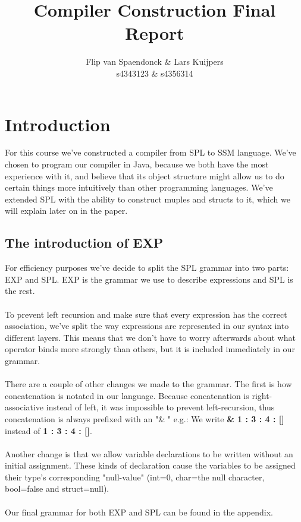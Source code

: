 \documentclass[10pt,a4paper]{article}
\author{Flip van Spaendonck \& Lars Kuijpers \\ s4343123 \& s4356314}
\title{Compiler Construction Final Report}
\begin{document}
\maketitle
\tableofcontents

\section{Introduction}
For this course we've constructed a compiler from SPL to SSM language. We've chosen to program our compiler in Java, because we both have the most experience with it, and believe that its object structure might allow us to do certain things more intuitively than other programming languages. We've extended SPL with the ability to construct muples and structs to it, which we will explain later on in the paper.

\subsection{The introduction of EXP}
For efficiency purposes we've decide to split the SPL grammar into two parts: EXP and SPL. EXP is the grammar we use to describe expressions and SPL is the rest. \\
\\
To prevent left recursion and make sure that every expression has the correct association, we've split the way expressions are represented in our syntax into different layers. This means that we don't have to worry afterwards about what operator binds more strongly than others, but it is included immediately in our grammar.\\
\\
There are a couple of other changes we made to the grammar. The first is how concatenation is notated in our language. Because concatenation is right-associative instead of left, it was impossible to prevent left-recursion, thus concatenation is always prefixed with an "\& " e.g.: We write \textbf{\& 1 : 3 : 4 : []} instead of \textbf{1 : 3 : 4 : []}.\\
\\
Another change is that we allow variable declarations to be written without an initial assignment. These kinds of declaration cause the variables to be assigned their type's corresponding "null-value" (int=0, char=the null character, bool=false and struct=null).\\
\\
Our final grammar for both EXP and SPL can be found in the appendix.
\end{document}
